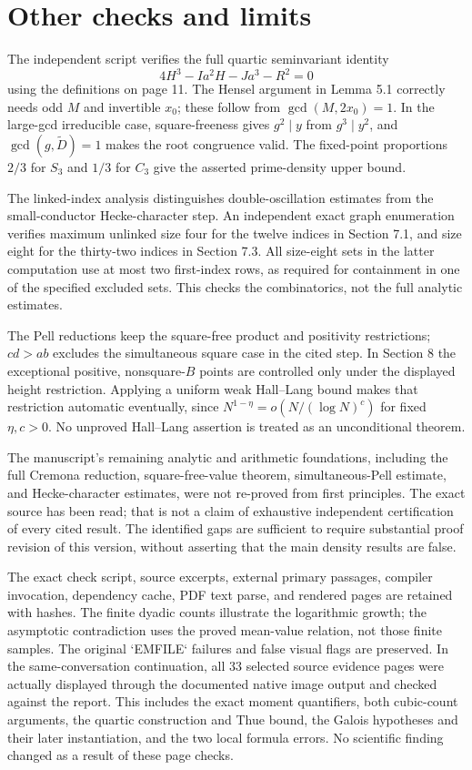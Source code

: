 \documentclass[10pt]{article}
\begin{document}
\section*{Other checks and limits}
The independent script verifies the full quartic seminvariant identity \[4H^3-Ia^2H-Ja^3-R^2=0\] using the definitions on page 11. The Hensel argument in Lemma 5.1 correctly needs odd \(M\) and invertible \(x_0\); these follow from \(\gcd(M,2x_0)=1\). In the large-gcd irreducible case, square-freeness gives \(g^2\mid y\) from \(g^3\mid y^2\), and \(\gcd(g,\widetilde D)=1\) makes the root congruence valid. The fixed-point proportions \(2/3\) for \(S_3\) and \(1/3\) for \(C_3\) give the asserted prime-density upper bound.\par
The linked-index analysis distinguishes double-oscillation estimates from the small-conductor Hecke-character step. An independent exact graph enumeration verifies maximum unlinked size four for the twelve indices in Section 7.1, and size eight for the thirty-two indices in Section 7.3. All size-eight sets in the latter computation use at most two first-index rows, as required for containment in one of the specified excluded sets. This checks the combinatorics, not the full analytic estimates.\par
The Pell reductions keep the square-free product and positivity restrictions; \(cd>ab\) excludes the simultaneous square case in the cited step. In Section 8 the exceptional positive, nonsquare-\(B\) points are controlled only under the displayed height restriction. Applying a uniform weak Hall–Lang bound makes that restriction automatic eventually, since \(N^{1-\eta}=o(N/(\log N)^c)\) for fixed \(\eta,c>0\). No unproved Hall–Lang assertion is treated as an unconditional theorem.\par
The manuscript’s remaining analytic and arithmetic foundations, including the full Cremona reduction, square-free-value theorem, simultaneous-Pell estimate, and Hecke-character estimates, were not re-proved from first principles. The exact source has been read; that is not a claim of exhaustive independent certification of every cited result. The identified gaps are sufficient to require substantial proof revision of this version, without asserting that the main density results are false.\par
The exact check script, source excerpts, external primary passages, compiler invocation, dependency cache, PDF text parse, and rendered pages are retained with hashes. The finite dyadic counts illustrate the logarithmic growth; the asymptotic contradiction uses the proved mean-value relation, not those finite samples. The original `EMFILE` failures and false visual flags are preserved. In the same-conversation continuation, all 33 selected source evidence pages were actually displayed through the documented native image output and checked against the report. This includes the exact moment quantifiers, both cubic-count arguments, the quartic construction and Thue bound, the Galois hypotheses and their later instantiation, and the two local formula errors. No scientific finding changed as a result of these page checks.\par
\end{document}
